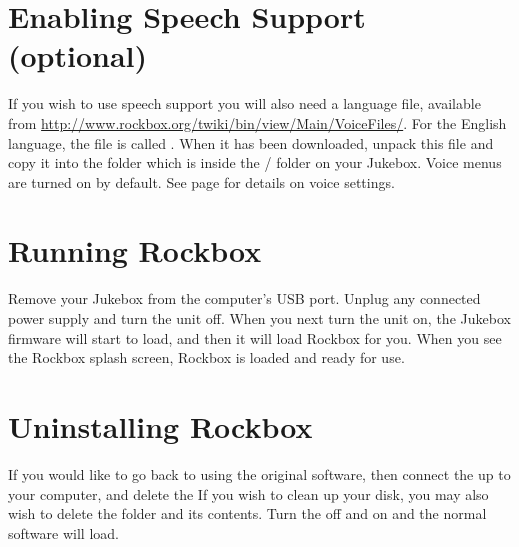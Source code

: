 \section{Enabling Speech Support (optional)}

If you wish to use speech support you will also need a language file,
available from
\url{http://www.rockbox.org/twiki/bin/view/Main/VoiceFiles/}.
 For the English language, the file is called .
When it has been downloaded, unpack this file and copy it into the
 folder which is inside the / folder on
your Jukebox. Voice menus are turned on by default.  See page
\pageref{ref:Voiceconfiguration} for details on voice settings.


\section{Running Rockbox}

Remove your Jukebox from the computer's USB port.
Unplug any connected power supply and turn the unit off. When you next
turn the unit on, the Jukebox firmware will start to load, and then it
will load Rockbox for you. When you see the Rockbox splash screen,
Rockbox is loaded and ready for use. 

\section{Uninstalling Rockbox}

If you would like to go back to using the
original \playername software, then connect the \playername up to your computer,
and delete the 
If you wish to clean up your disk, you may also wish to delete the
 folder and its contents. Turn the \playername off and on and
the normal \playername software will load.
